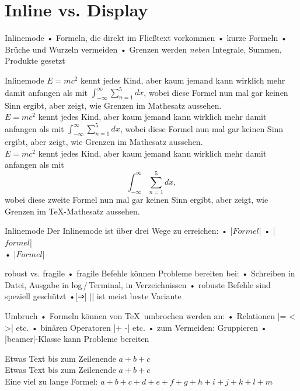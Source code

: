 
\usepackage[normalem]{ulem}


\section{Inline vs. Display}
\begin{frame}{Inlinemode}
• Formeln, die direkt im Fließtext vorkommen
• kurze Formeln
• Brüche und Wurzeln vermeiden
• Grenzen werden \emph{neben} Integrale, Summen, Produkte gesetzt
\•
\end{frame}

\begin{frame}[fragile]{Inlinemode}
\rmfamily
$E=mc^2$ kennt jedes Kind, aber kaum jemand kann wirklich mehr damit anfangen als mit $\int^\infty_{-\infty}\sum_{n = 1}^5 dx$, wobei diese Formel nun mal gar keinen Sinn ergibt, aber zeigt, wie Grenzen im Mathesatz aussehen.\\
$E=mc^2$ kennt jedes Kind, aber kaum jemand kann wirklich mehr damit anfangen als mit $\displaystyle \int^\infty_{-\infty}\sum_{n = 1}^5 dx$, wobei diese Formel nun mal gar keinen Sinn ergibt, aber zeigt, wie Grenzen im Mathesatz aussehen.\\
$E=mc^2$ kennt jedes Kind, aber kaum jemand kann wirklich mehr damit anfangen als mit \[\int^\infty_{-\infty}\sum_{n = 1}^5 dx,\] wobei diese zweite Formel nun mal gar keinen Sinn ergibt, aber zeigt, wie Grenzen im \TeX-Mathesatz aussehen.\\
\end{frame}

\begin{frame}[fragile]{Inlinemode}
Der Inlinemode ist über drei Wege zu erreichen:
• |\(Formel\)| 
• |\begin{math} formel \end{math}| \\ 
• |$Formel$| 
\•
\end{frame}

\begin{frame}[fragile]{robust vs. fragile}
• fragile Befehle können Probleme bereiten bei:
• Schreiben in Datei, Ausgabe in log\,/\,Terminal, in Verzeichnissen
• robuste Befehle sind speziell geschützt
•[⇒] |$ $| ist meist beste Variante
\•
\end{frame}

\begin{frame}[fragile]{Umbruch}
• Formeln können von \TeX\ umbrochen werden an:
• Relationen |= < >| etc.
• binären Operatoren |+ -| etc.
• zum Vermeiden: Gruppieren
• |beamer|-Klasse kann Probleme bereiten
\•\pause
\begin{LTXexample}
Etwas Text bis zum Zeilenende
$a + b + c$\\
Etwas Text bis zum Zeilenende
${a + b + c}$\\
Eine viel zu lange Formel:
${a+b+c+d+e+f+g+h+i+j+k+l+m}$
\end{LTXexample}
\end{frame}

